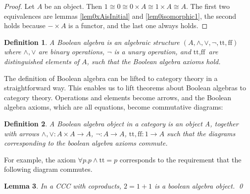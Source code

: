 \documentclass[a4paper]{article}
\newcommand{\arr}{\rightarrow}
\newcommand{\product}{\!\times\!}
\newtheorem{definition}{Definition}[section]
\newtheorem{lemma}[definition]{Lemma}
\begin{document}
\begin{proof}
Let $A$ be an object.  Then $1 \cong 0 \cong 0 \product A \cong 1 \product A
\cong A$. The first two equivalences are lemmas \ref{lem0xAisInitial} and
\ref{lem0isomorphic1}, the second holds because $- \product A$ is a functor, and
the last one always holds.
\end{proof}

\newcommand{\true}{\text{tt}}
\newcommand{\false}{\text{ff}}

\begin{definition}
A \emph{Boolean algebra} is an algebraic structure $(A, \wedge, \vee, \neg,
\true, \false)$ where $\wedge, \vee$ are binary operations, $\neg$ is a unary
operation, and $\true, \false$ are distinguished elements of $A$, such that the
Boolean algebra axioms hold.
\end{definition}

The definition of Boolean algebra can be lifted to category theory in a
straightforward way. This enables us to lift theorems about Boolean algebras to
category theory. Operations and elements become arrows, and the Boolean algebra
axioms, which are all equations, become commutative diagrams:

\begin{definition}
A \emph{Boolean algebra object} in a category is an object A,
together with arrows $\wedge, \vee : A \product A \arr A$, $\neg : A \arr A$,
$\true, \false : 1 \arr A$ such that the diagrams corresponding to the boolean
algebra axioms commute.
\end{definition}

For example, the axiom $\forall p . p \wedge \true = p$ corresponds to the
requirement that the following diagram commutes.

\begin{figure}[h]
\begin{center}
\end{center}
\end{figure}

\begin{lemma}
In a CCC with coproducts, $2 = 1+1$ is a boolean algebra object. \qed
\end{lemma}
\end{document}
